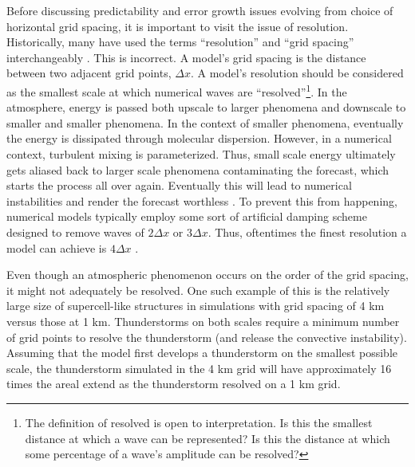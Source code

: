 Before discussing predictability and error growth issues evolving from choice of horizontal grid spacing, it is important to visit the issue of resolution. Historically, many have used the terms ``resolution'' and ``grid spacing'' interchangeably \citep{grasso2000resolution, pielke1991resolution}. This is incorrect. A model's grid spacing is the distance between two adjacent grid points, $\Delta x$. A model's resolution should be considered as the smallest scale at which numerical waves are ``resolved''\footnote{The definition of resolved is open to interpretation. Is this the smallest distance at which a wave can be represented? Is this the distance at which some percentage of a wave's amplitude can be resolved?}. In the atmosphere, energy is passed both upscale to larger phenomena and downscale to smaller and smaller phenomena. In the context of smaller phenomena, eventually the energy is dissipated through molecular dispersion. However, in a numerical context, turbulent mixing is parameterized. Thus, small scale energy ultimately gets aliased back to larger scale phenomena contaminating the forecast, which starts the process all over again. Eventually this will lead to numerical instabilities and render the forecast worthless \citep{phillips1959instabilities}. To prevent this from happening, numerical models typically employ some sort of artificial damping scheme designed to remove waves of $2\Delta x$ or $3\Delta x$. Thus, oftentimes the finest resolution a model can achieve is  $4\Delta x$ \citep{grasso2000resolution}.


Even though an atmospheric phenomenon occurs on the order of the grid spacing, it might not adequately be resolved. One such example of this is the relatively large size of supercell-like structures in simulations with grid spacing of 4 km versus those at 1 km. Thunderstorms on both scales require a minimum number of grid points to resolve the thunderstorm (and release the convective instability). Assuming that the model first develops a thunderstorm on the smallest possible scale, the thunderstorm simulated in the 4 km grid will have approximately 16 times the areal extend as the thunderstorm resolved on a 1 km grid.


